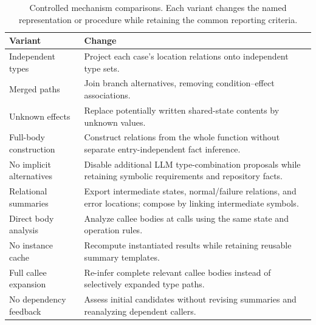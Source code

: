 \begin{table}[t]
\centering
\small
\caption{Controlled mechanism comparisons. Each variant changes the named representation or procedure while retaining the common reporting criteria.}
\label{tab:variants}
\begin{tabularx}{\linewidth}{@{}lX@{}}
\toprule
Variant & Change\\
\midrule
Independent types & Project each case's location relations onto independent type sets.\\
Merged paths & Join branch alternatives, removing condition--effect associations.\\
Unknown effects & Replace potentially written shared-state contents by unknown values.\\
Full-body construction & Construct relations from the whole function without separate entry-independent fact inference.\\
No implicit alternatives & Disable additional LLM type-combination proposals while retaining symbolic requirements and repository facts.\\
Relational summaries & Export intermediate states, normal/failure relations, and error locations; compose by linking intermediate symbols.\\
Direct body analysis & Analyze callee bodies at calls using the same state and operation rules.\\
No instance cache & Recompute instantiated results while retaining reusable summary templates.\\
Full callee expansion & Re-infer complete relevant callee bodies instead of selectively expanded type paths.\\
No dependency feedback & Assess initial candidates without revising summaries and reanalyzing dependent callers.\\
\bottomrule
\end{tabularx}
\end{table}

